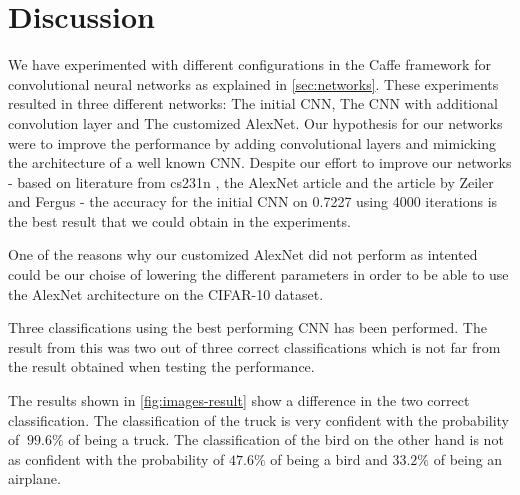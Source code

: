 \graphicspath{{Chapters/Project/}}

\section{Discussion} %
\label{sec:discussion}

We have experimented with different configurations in the Caffe framework for convolutional neural networks as explained in \autoref{sec:networks}. These experiments resulted in three different networks: The initial CNN, The CNN with additional convolution layer and The customized AlexNet. Our hypothesis for our networks were to improve the performance by adding convolutional layers and mimicking the architecture of a well known CNN. Despite our effort to improve our
networks - based on literature from cs231n \cite{cs231n}, the AlexNet
article\cite{AlexNet} and the article by Zeiler and Fergus \cite{ZeilerFergus} - the accuracy for the initial CNN on 0.7227 using 4000 iterations is the best result that we could obtain in the experiments.

One of the reasons why our customized AlexNet did not perform as intented could be our choise of lowering the different parameters in order to be able to use the AlexNet architecture on the CIFAR-10 dataset.

Three classifications using the best performing CNN has been performed. The result from this was two out of three correct classifications which is not far from the result obtained when testing the performance.

The results shown in \autoref{fig:images-result} show a difference in the two correct classification. The classification of the truck is very confident with the probability of $~99.6\%$ of being a truck. The classification of the bird on the other hand is not as confident with the probability of $47.6\%$ of being a bird and $33.2\%$ of being an airplane.

